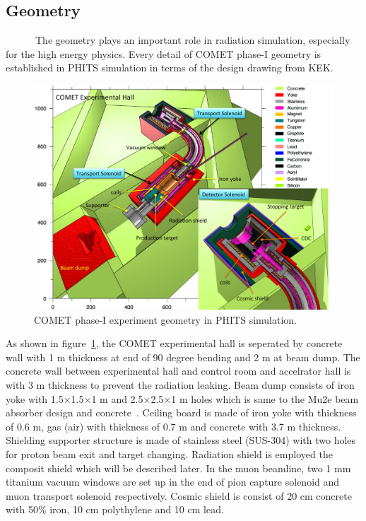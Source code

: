   \subsection{Geometry}
~~~~~~The geometry plays an important role in radiation simulation, especially for the high energy physics.
Every detail of COMET phase-I geometry is established in PHITS simulation in terms of the design drawing from KEK.
 \begin{figure}[H]
   \centering
   \includegraphics[scale=0.5]{chapter3/fig/geo.pdf}
   \caption{COMET phase-I experiment geometry in PHITS simulation.}
   \label{geom}
  \end{figure}
As shown in figure~\ref{geom}, the COMET experimental hall is seperated by concrete wall with 1 m thickness at end of 90 degree bending and 2 m at beam dump.
The concrete wall between experimental hall and control room and accelrator hall is with 3 m thickness to prevent the radiation leaking.
Beam dump consists of iron yoke with 1.5$\times$1.5$\times$1 m and 2.5$\times$2.5$\times$1 m holes which is same to the Mu2e beam absorber design and concrete~\cite{mu2ereport}.
Ceiling board is made of iron yoke with thickness of 0.6 m, gas (air) with thickness of 0.7 m and concrete with 3.7 m thickness.
Shielding supporter structure is made of stainless steel (SUS-304) with two holes for proton beam exit and target changing.
Radiation shield is employed the composit shield which will be described later.
In the muon beamline, two 1 mm titanium vacuum windows are set up in the end of pion capture solenoid and muon transport solenoid respectively.
Cosmic shield is consist of 20 cm concrete with 50\% iron, 10 cm polythylene and 10 cm lead.

